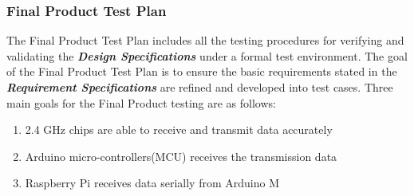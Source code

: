 \pagebreak
\subsubsection{Final Product Test Plan}
\medskip
The Final Product Test Plan includes all the testing procedures for verifying and validating the \textbf{\textit{Design Specifications}} under a formal
 test environment. The goal of the Final Product Test Plan is to ensure the basic requirements stated in the \textbf{\textit{Requirement Specifications}}
 are refined and developed into test cases. Three main goals for the Final Product testing are as follows:
\begin{enumerate}
    \item 2.4 GHz chips are able to receive and transmit data accurately
    \item Arduino micro-controllers(MCU) receives the transmission data 
    \item Raspberry Pi receives data serially from Arduino M
\end{enumerate}


